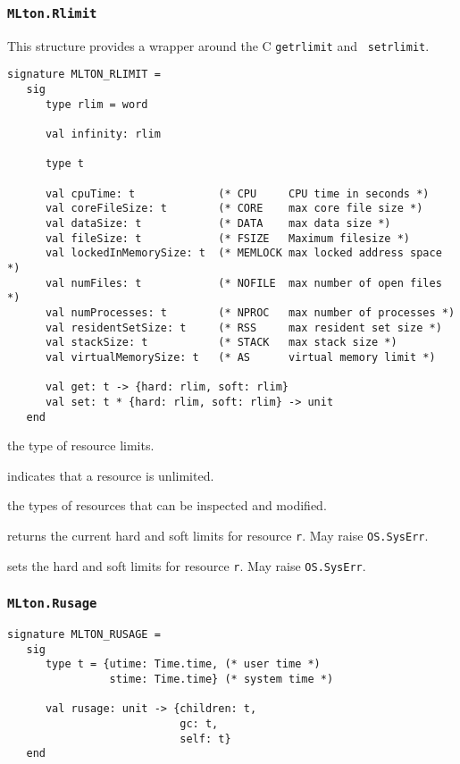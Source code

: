 \subsubsection{\tt MLton.Rlimit}

This structure provides a wrapper around the C {\tt getrlimit} and {\tt
setrlimit}.
\begin{verbatim}
signature MLTON_RLIMIT =
   sig
      type rlim = word
               
      val infinity: rlim

      type t
               
      val cpuTime: t             (* CPU     CPU time in seconds *)
      val coreFileSize: t        (* CORE    max core file size *)
      val dataSize: t            (* DATA    max data size *)
      val fileSize: t            (* FSIZE   Maximum filesize *)
      val lockedInMemorySize: t  (* MEMLOCK max locked address space *)
      val numFiles: t            (* NOFILE  max number of open files *)  
      val numProcesses: t        (* NPROC   max number of processes *)
      val residentSetSize: t     (* RSS     max resident set size *)
      val stackSize: t           (* STACK   max stack size *)
      val virtualMemorySize: t   (* AS      virtual memory limit *)
      
      val get: t -> {hard: rlim, soft: rlim}
      val set: t * {hard: rlim, soft: rlim} -> unit
   end
\end{verbatim}

\begin{description}
the type of resource limits.

indicates that a resource is unlimited.

the types of resources that can be inspected and modified.

returns the current hard and soft limits for resource {\tt r}. May
raise {\tt OS.SysErr}.

sets the hard and soft limits for resource {\tt r}.  May raise {\tt OS.SysErr}.
\end{description}
%
\subsubsection{\tt MLton.Rusage}

\begin{verbatim}
signature MLTON_RUSAGE =
   sig
      type t = {utime: Time.time, (* user time *)
                stime: Time.time} (* system time *)
         
      val rusage: unit -> {children: t,
                           gc: t,
                           self: t}
   end
\end{verbatim}

